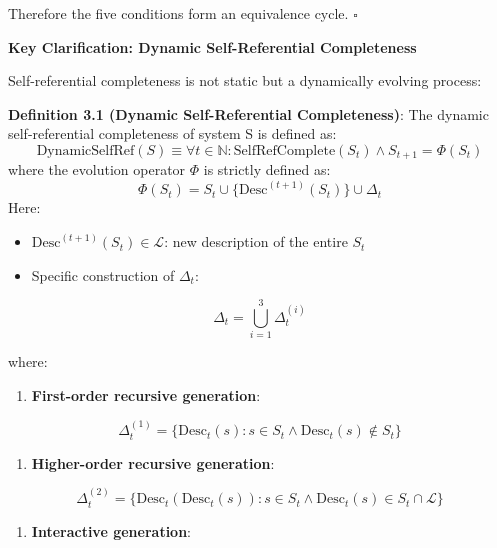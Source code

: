 Therefore the five conditions form an equivalence cycle. $\square$

\textbf{Key Clarification: Dynamic Self-Referential Completeness}

Self-referential completeness is not static but a dynamically evolving process:

\textbf{Definition 3.1 (Dynamic Self-Referential Completeness)}:
\label{thm:1.2}
The dynamic self-referential completeness of system S is defined as:
\begin{equation}
\text{DynamicSelfRef}(S) \equiv \forall t \in \mathbb{N}: \text{SelfRefComplete}(S_t) \land S_{t+1} = \Phi(S_t)
\end{equation}
where the evolution operator $\Phi$ is strictly defined as:
\begin{equation}
\Phi(S_t) = S_t \cup \{\text{Desc}^{(t+1)}(S_t)\} \cup \Delta_t
\end{equation}
Here:
\begin{itemize}
\item $\text{Desc}^{(t+1)}(S_t) \in \mathcal{L}$: new description of the entire $S_t$
\item Specific construction of $\Delta_t$:
\end{itemize}

\begin{equation}
\Delta_t = \bigcup_{i=1}^{3} \Delta_t^{(i)}
\end{equation}

where:
\begin{enumerate}
\item \textbf{First-order recursive generation}:
\end{enumerate}
   
\begin{equation}
\Delta_t^{(1)} = \{\text{Desc}_t(s) : s \in S_t \land \text{Desc}_t(s) \notin S_t\}
\end{equation}
\begin{enumerate}
\item \textbf{Higher-order recursive generation}:
\end{enumerate}
   
\begin{equation}
\Delta_t^{(2)} = \{\text{Desc}_t(\text{Desc}_t(s)) : s \in S_t \land \text{Desc}_t(s) \in S_t \cap \mathcal{L}\}
\end{equation}
\begin{enumerate}
\item \textbf{Interactive generation}:
\end{enumerate}
   
